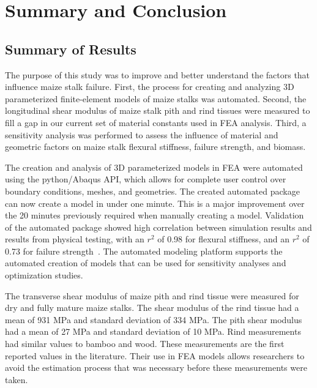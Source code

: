 \chapter{Summary and Conclusion}
\label{ch:ch5}

\section{Summary of Results}
\label{sec:summary_of_results}
The purpose of this study was to improve and better understand the factors that influence maize stalk failure. First, the process for creating and analyzing 3D parameterized finite-element models of maize stalks was automated. Second, the longitudinal shear modulus of maize stalk pith and rind tissues were measured to fill a gap in our current set of material constants used in FEA analysis. Third, a sensitivity analysis was performed to assess the influence of material and geometric factors on maize stalk flexural stiffness, failure strength, and biomass.

The creation and analysis of 3D parameterized models in FEA were automated using the python/Abaqus API, which allows for complete user control over boundary conditions, meshes, and geometries. The created automated package can now create a model in under one minute. This is a major improvement over the 20 minutes previously required when manually creating a model. Validation of the automated package showed high correlation between simulation results and results from physical testing, with an ${r^{2}}$ of 0.98 for flexural stiffness, and an ${r^{2}}$ of 0.73 for failure strength~. The automated modeling platform supports the automated creation of models that can be used for sensitivity analyses and optimization studies.

The transverse shear modulus of maize pith and rind tissue were measured for dry and fully mature maize stalks. The shear modulus of the rind tissue had a mean of 931 MPa and standard deviation of 334 MPa. The pith shear modulus had a mean of 27 MPa and standard deviation of 10 MPa. Rind measurements had similar values to bamboo and wood. These measurements are the first reported values in the literature. Their use in FEA models allows researchers to avoid the estimation process that was necessary before these measurements were taken. 

